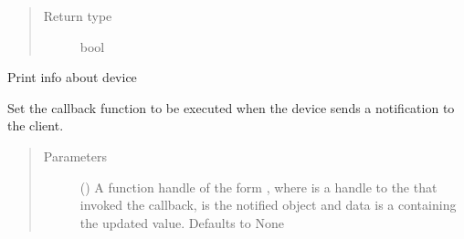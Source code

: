 \documentclass[letterpaper,10pt,english]{sphinxmanual}
\begin{document}
\begin{fulllineitems}
\begin{fulllineitems}
\begin{quote}
\begin{description}
\item[{Return type}] \leavevmode
bool

\end{description}\end{quote}

\end{fulllineitems}


\begin{fulllineitems}
\label{\detokenize{simpleble:simpleble.SimpleBleDevice.printInfo}}
Print info about device

\end{fulllineitems}


\begin{fulllineitems}
\label{\detokenize{simpleble:simpleble.SimpleBleDevice.setNotificationCallback}}
Set the callback function to be executed when the device sends a notification to the client.
\begin{quote}\begin{description}
\item[{Parameters}] \leavevmode
{} (\sphinxstyleliteralemphasis{\sphinxupquote{, }}) \textendash{} A function handle of the form , where  is a handle to the {\hyperref[\detokenize{simpleble:simpleble.SimpleBleClient}]{}} that invoked the callback,  is the notified  object and data is a  containing the updated value. Defaults to None

\end{description}\end{quote}

\end{fulllineitems}


\end{fulllineitems}
\end{document}

